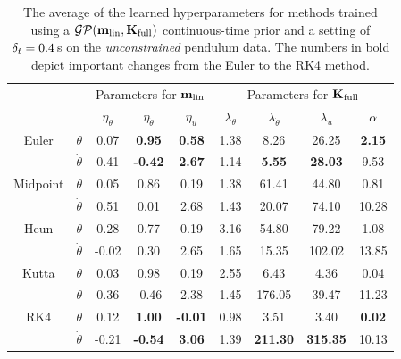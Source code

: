 \begin{table}[]
\renewcommand{\arraystretch}{1.3}
\begin{center}
\small
\begin{tabular}{ cc | ccc | ccc | c }
\toprule[1.5pt] 
&& \multicolumn{3}{c|}{Parameters for $\mathbf{m}_{\text{lin}}$}
& \multicolumn{4}{c}{Parameters for $\mathbf{K}_{\text{full}}$} \\
&& $\eta_{\theta}$ & $\eta_{\dot\theta}$ & $\eta_{u}$ 
& $\lambda_{\theta}$ & $\lambda_{\dot\theta}$ & \multicolumn{1}{c}{ $\lambda_{u}$ } & $\alpha$ \\
\hline
%
Euler & $\theta$ &
0.07  &  {\bf0.95}  &  {\bf0.58}  &  1.38  &  8.26 &  26.25  &  {\bf2.15} \\
 & $\dot\theta$ &
0.41 &  {\bf-0.42}  &  {\bf2.67}  &  1.14  &  {\bf5.55} &  {\bf28.03}  &  9.53 \\
\hline
%
Midpoint & $\theta$ &
0.05 & 0.86 & 0.19 & 1.38 & 61.41 & 44.80 & 0.81 \\
 & $\dot\theta$ &
0.51 & 0.01 & 2.68 & 1.43 & 20.07 & 74.10 & 10.28 \\
\hline
%
Heun & $\theta$ &
0.28 & 0.77 & 0.19 & 3.16 & 54.80 & 79.22 & 1.08 \\
 & $\dot\theta$ &
-0.02 & 0.30 & 2.65 & 1.65 & 15.35 & 102.02 & 13.85 \\
\hline
%
Kutta & $\theta$ &
0.03 & 0.98 & 0.19 & 2.55 & 6.43 & 4.36 & 0.04 \\
& $\dot\theta$ &
0.36 & -0.46 & 2.38 & 1.45 & 176.05 & 39.47 & 11.23 \\
\hline
%
RK4 & $\theta$ &
0.12 & {\bf1.00} & {\bf-0.01} & 0.98 & 3.51 & 3.40 & {\bf0.02} \\
 & $\dot\theta$ &
-0.21 & {\bf-0.54} & {\bf3.06} & 1.39 & {\bf211.30} & {\bf315.35} & 10.13 \\
\bottomrule[1.5pt]
\end{tabular}
\end{center}
\caption{The average of the learned hyperparameters for methods trained using a $\mathcal{GP}(\mathbf{m}_{\text{lin}},\mathbf{K}_{\text{full}})$ continuous-time prior and a setting of $\delta_t=0.4\,$s on the \textit{unconstrained} pendulum data. The numbers in bold depict important changes from the Euler to the RK4 method.}
\label{tab:hyps_dt04}
\end{table}

